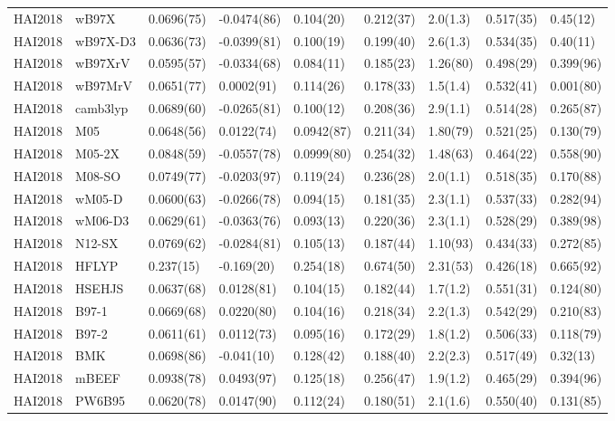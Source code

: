 \begin{table}[ht]
\begin{tabular}{lllllllll}
  HAI2018 & wB97X & 0.0696(75) & -0.0474(86) & 0.104(20) & 0.212(37) & 2.0(1.3) & 0.517(35) & 0.45(12) \\ 
  HAI2018 & wB97X-D3 & 0.0636(73) & -0.0399(81) & 0.100(19) & 0.199(40) & 2.6(1.3) & 0.534(35) & 0.40(11) \\ 
  HAI2018 & wB97XrV & 0.0595(57) & -0.0334(68) & 0.084(11) & 0.185(23) & 1.26(80) & 0.498(29) & 0.399(96) \\ 
  HAI2018 & wB97MrV & 0.0651(77) & 0.0002(91) & 0.114(26) & 0.178(33) & 1.5(1.4) & 0.532(41) & 0.001(80) \\ 
  HAI2018 & camb3lyp & 0.0689(60) & -0.0265(81) & 0.100(12) & 0.208(36) & 2.9(1.1) & 0.514(28) & 0.265(87) \\ 
  HAI2018 & M05 & 0.0648(56) & 0.0122(74) & 0.0942(87) & 0.211(34) & 1.80(79) & 0.521(25) & 0.130(79) \\ 
  HAI2018 & M05-2X & 0.0848(59) & -0.0557(78) & 0.0999(80) & 0.254(32) & 1.48(63) & 0.464(22) & 0.558(90) \\ 
  HAI2018 & M08-SO & 0.0749(77) & -0.0203(97) & 0.119(24) & 0.236(28) & 2.0(1.1) & 0.518(35) & 0.170(88) \\ 
  HAI2018 & wM05-D & 0.0600(63) & -0.0266(78) & 0.094(15) & 0.181(35) & 2.3(1.1) & 0.537(33) & 0.282(94) \\ 
  HAI2018 & wM06-D3 & 0.0629(61) & -0.0363(76) & 0.093(13) & 0.220(36) & 2.3(1.1) & 0.528(29) & 0.389(98) \\ 
  HAI2018 & N12-SX & 0.0769(62) & -0.0284(81) & 0.105(13) & 0.187(44) & 1.10(93) & 0.434(33) & 0.272(85) \\ 
  HAI2018 & HFLYP & 0.237(15) & -0.169(20) & 0.254(18) & 0.674(50) & 2.31(53) & 0.426(18) & 0.665(92) \\ 
  HAI2018 & HSEHJS & 0.0637(68) & 0.0128(81) & 0.104(15) & 0.182(44) & 1.7(1.2) & 0.551(31) & 0.124(80) \\ 
  HAI2018 & B97-1 & 0.0669(68) & 0.0220(80) & 0.104(16) & 0.218(34) & 2.2(1.3) & 0.542(29) & 0.210(83) \\ 
  HAI2018 & B97-2 & 0.0611(61) & 0.0112(73) & 0.095(16) & 0.172(29) & 1.8(1.2) & 0.506(33) & 0.118(79) \\ 
  HAI2018 & BMK & 0.0698(86) & -0.041(10) & 0.128(42) & 0.188(40) & 2.2(2.3) & 0.517(49) & 0.32(13) \\ 
  HAI2018 & mBEEF & 0.0938(78) & 0.0493(97) & 0.125(18) & 0.256(47) & 1.9(1.2) & 0.465(29) & 0.394(96) \\ 
  HAI2018 & PW6B95 & 0.0620(78) & 0.0147(90) & 0.112(24) & 0.180(51) & 2.1(1.6) & 0.550(40) & 0.131(85) \\ 

\end{tabular}
\end{table}
